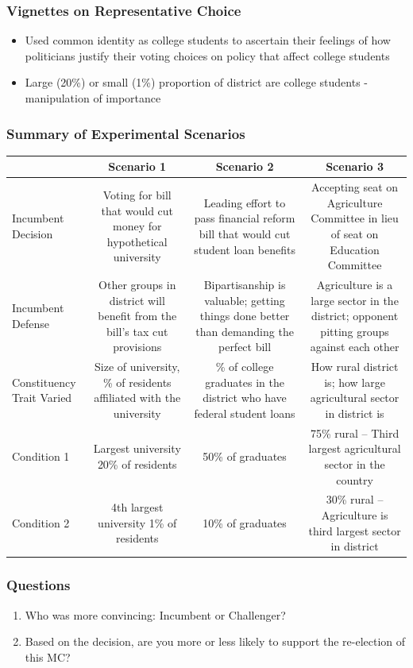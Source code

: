\documentclass[14pt]{beamer}
\newcommand\tb{\textbf}
\begin{document}
\begin{frame}
\frametitle{Vignettes on Representative Choice}
\begin{itemize}
	\item Used common identity as college students to ascertain their feelings of how politicians justify their voting choices on policy that affect college students
	\item Large (20\%) or small (1\%) proportion of district are college students - manipulation of importance
\end{itemize}
\end{frame}

\begin{frame}
\frametitle{Summary of Experimental Scenarios}
\tiny
\begin{table}
	\centering
	\def\arraystretch{1.5}
	\begin{tabulary}{\linewidth}{lCCC}
	\\
	\hline
	&\tb{Scenario 1}&\tb{Scenario 2}&\tb{Scenario 3}\\
	\hline
	Incumbent Decision&Voting for bill that would cut money for hypothetical university&Leading effort to pass financial reform bill that would cut student loan benefits&Accepting seat on Agriculture Committee in lieu of seat on Education Committee\\
	\hline
	Incumbent Defense&Other groups in district will benefit from the bill’s tax cut provisions&Bipartisanship is valuable; getting things done better than demanding the perfect bill&Agriculture is a large sector in the district; opponent pitting groups against each other\\
	\hline
	Constituency Trait Varied&Size of university, 
	\% of residents affiliated with the university&\% of college graduates in the district who have federal student loans&How rural district is; how large agricultural sector in district is\\
	\hline
	Condition 1&Largest university
	20\% of residents&50\% of graduates&75\% rural --
	Third largest agricultural sector in the country
\\
	\hline
	Condition 2&4th largest university
	1\% of residents&10\% of graduates&30\% rural
-- Agriculture is third largest sector in district
\\
	\hline
	\end{tabulary}
\end{table}
\end{frame}

\begin{frame}
\frametitle{Questions}
\begin{enumerate}
	\item Who was more convincing: Incumbent or Challenger?
	\item Based on the decision, are you more or less likely to support the re-election of this MC?
\end{enumerate}
\end{frame}
\end{document}
